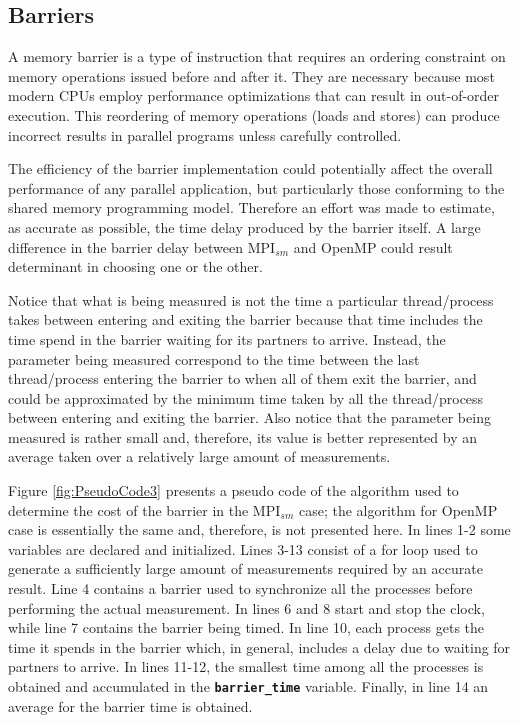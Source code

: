\newpage

\subsection*{Barriers}

A memory barrier is a type of instruction that requires an ordering constraint on memory operations issued before and after it. They are necessary because most modern CPUs employ performance optimizations that can result in out-of-order execution. This reordering of memory operations (loads and stores) can produce incorrect results in parallel programs unless carefully controlled.

\medskip


The efficiency of the barrier implementation could potentially affect the overall performance of any parallel application, but particularly those conforming to the shared memory programming model. Therefore an effort was made to estimate, as accurate as possible, the time delay produced by the barrier itself. A large difference in the barrier delay between MPI$_{sm}$ and OpenMP could result determinant in choosing one or the other.

\medskip

Notice that what is being measured is not the time a particular thread/process takes between entering and exiting
the barrier because that time includes the time spend in the barrier waiting for its partners to arrive. Instead, the parameter being measured correspond to the time between the last thread/process entering the barrier to when all of them exit the barrier\cite{Schmidt_2012}, and could be approximated by the minimum time taken by all the thread/process between entering and exiting the barrier. Also notice that the parameter being measured is rather small and, therefore, its value is better represented by an average taken over a relatively large amount of measurements.


\medskip

Figure \ref{fig:PseudoCode3} presents a pseudo code of the algorithm used to determine the cost of the barrier in the MPI$_{sm}$ case; the algorithm for OpenMP case is essentially the same and, therefore, is not presented here. In lines 1-2 some variables are declared and initialized. Lines 3-13 consist of a for loop used to generate a sufficiently large amount of measurements required by an accurate result. Line 4 contains a barrier used to synchronize all the processes before performing the actual measurement. In lines 6 and 8 start and stop the clock, while line 7 contains the barrier being timed. In line 10, each process gets the time it spends in the barrier which, in general, includes a delay due to waiting for partners to arrive. In lines 11-12, the smallest time among all the processes is obtained and accumulated in the \textbf{\texttt{barrier\_time}} variable. Finally, in line 14 an average for the barrier time is obtained.



